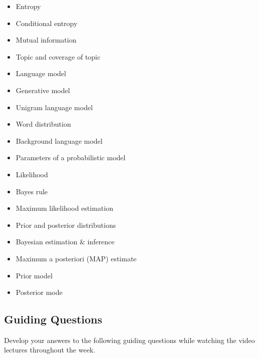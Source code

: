 \documentclass[11pt]{article}
\providecommand{\tightlist}{%
      \setlength{\itemsep}{0pt}\setlength{\parskip}{0pt}}
\begin{document}
\begin{itemize}
\tightlist
\item
  Entropy
\item
  Conditional entropy
\item
  Mutual information
\item
  Topic and coverage of topic
\item
  Language model
\item
  Generative model
\item
  Unigram language model
\item
  Word distribution
\item
  Background language model
\item
  Parameters of a probabilistic model
\item
  Likelihood
\item
  Bayes rule
\item
  Maximum likelihood estimation
\item
  Prior and posterior distributions
\item
  Bayesian estimation \& inference
\item
  Maximum a posteriori (MAP) estimate
\item
  Prior model
\item
  Posterior mode
\end{itemize}

    \subsection{Guiding Questions}\label{guiding-questions}

Develop your answers to the following guiding questions while watching
the video lectures throughout the week.
\end{document}
